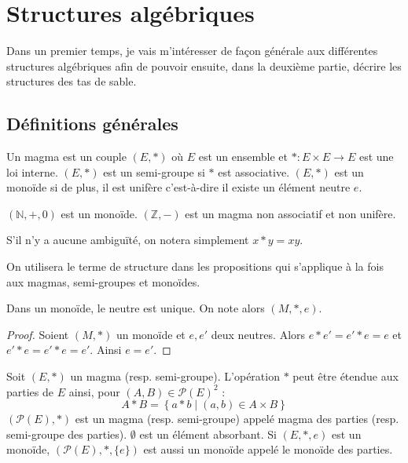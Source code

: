 
\section{Structures algébriques}

Dans un premier temps, je vais m'intéresser de façon générale aux différentes
structures algébriques afin de pouvoir ensuite, dans la deuxième partie, décrire
les structures des tas de sable.

\subsection{Définitions générales}

\begin{definition}
Un magma est un couple $(E, *)$ où $E$ est un ensemble et $*: E \times E
\rightarrow E$ est une loi interne.
$(E, *)$ est un semi-groupe si $*$ est associative.
$(E, *)$ est un monoïde si de plus, il est unifère
c'est-à-dire il existe un élément neutre $e$.
\end{definition}

\begin{exemple}
$(\mathbb{N}, +, 0)$ est un monoïde.
$(\mathbb{Z}, -)$ est un magma non associatif et non unifère.
\end{exemple}

\begin{remarque}
S'il n'y a aucune ambiguïté, on notera simplement $x * y = xy$.
\end{remarque}

\begin{remarque}
On utilisera le terme de structure dans les propositions qui s'applique à la fois aux magmas, semi-groupes et monoïdes.
\end{remarque}

\begin{proposition}
Dans un monoïde, le neutre est unique.
On note alors $(M, *, e)$.
\end{proposition}

\begin{proof}
Soient $(M, *)$ un monoïde et $e, e'$ deux neutres.
Alors $e * e' = e' * e = e$ et $e' * e = e' * e = e'$.
Ainsi $e = e'$.
\end{proof}

\begin{definition}
Soit $(E, *)$ un magma (resp. semi-groupe).
L'opération $*$ peut être étendue aux parties de $E$ ainsi,
pour $(A, B) \in \mathcal{P}(E)^2$ :
\begin{equation}
    A * B = \left\{ a * b \;|\; (a, b) \in A \times B \right\}
\end{equation}
$(\mathcal{P}(E), *)$ est un magma (resp. semi-groupe)
appelé magma des parties (resp. semi-groupe des parties).
$\emptyset$ est un élément absorbant.
Si $(E, *, e)$ est un monoïde, $(\mathcal{P}(E), *, \{e\})$ est aussi un monoïde appelé le monoïde des parties.
\end{definition}

